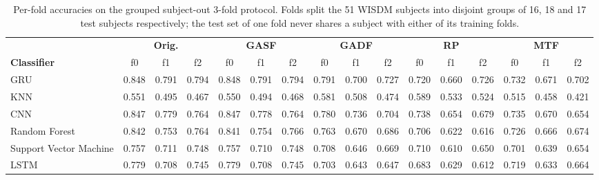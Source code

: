 \begin{table}[H]
\centering
\caption{Per-fold accuracies on the grouped subject-out 3-fold protocol. Folds split the 51 WISDM subjects into disjoint groups of 16, 18 and 17 test subjects respectively; the test set of one fold never shares a subject with either of its training folds.}
\label{tab:gadf_summary_perfold_loso}
\setlength{\tabcolsep}{3pt}
\footnotesize
\begin{tabular}{l|ccc|ccc|ccc|ccc|ccc}
\toprule
 & \multicolumn{3}{c|}{\textbf{Orig.}} & \multicolumn{3}{c|}{\textbf{GASF}} & \multicolumn{3}{c|}{\textbf{GADF}} & \multicolumn{3}{c|}{\textbf{RP}} & \multicolumn{3}{c}{\textbf{MTF}} \\
\textbf{Classifier} & f0 & f1 & f2 & f0 & f1 & f2 & f0 & f1 & f2 & f0 & f1 & f2 & f0 & f1 & f2 \\
\midrule
GRU & 0.848 & 0.791 & 0.794 & 0.848 & 0.791 & 0.794 & 0.791 & 0.700 & 0.727 & 0.720 & 0.660 & 0.726 & 0.732 & 0.671 & 0.702 \\
KNN & 0.551 & 0.495 & 0.467 & 0.550 & 0.494 & 0.468 & 0.581 & 0.508 & 0.474 & 0.589 & 0.533 & 0.524 & 0.515 & 0.458 & 0.421 \\
CNN & 0.847 & 0.779 & 0.764 & 0.847 & 0.778 & 0.764 & 0.780 & 0.736 & 0.704 & 0.738 & 0.654 & 0.679 & 0.735 & 0.670 & 0.654 \\
Random Forest & 0.842 & 0.753 & 0.764 & 0.841 & 0.754 & 0.766 & 0.763 & 0.670 & 0.686 & 0.706 & 0.622 & 0.616 & 0.726 & 0.666 & 0.674 \\
Support Vector Machine & 0.757 & 0.711 & 0.748 & 0.757 & 0.710 & 0.748 & 0.708 & 0.646 & 0.669 & 0.710 & 0.610 & 0.650 & 0.701 & 0.639 & 0.654 \\
LSTM & 0.779 & 0.708 & 0.745 & 0.779 & 0.708 & 0.745 & 0.703 & 0.643 & 0.647 & 0.683 & 0.629 & 0.612 & 0.719 & 0.633 & 0.664 \\

\bottomrule
\end{tabular}
\end{table}


